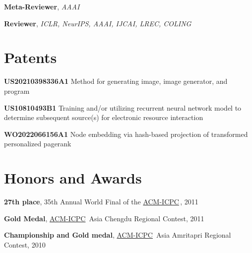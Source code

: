 \documentclass[line,margin]{cv}
\newcommand{\myemph}{\textbf}
\newcommand{\ICPC}{\href{http://icpc.baylor.edu/}{ACM-ICPC}}
\begin{document}
\begin{resume}
  \myemph{Meta-Reviewer}, \emph{AAAI}

  \myemph{Reviewer}, \emph{ICLR, NeurIPS, AAAI, IJCAI, LREC, COLING}

\section{Patents}

  \myemph{US20210398336A1} Method for generating image, image generator, and program

  \myemph{US10810493B1} Training and/or utilizing recurrent neural network model to determine subsequent source(s) for electronic resource interaction
  
  \myemph{WO2022066156A1} Node embedding via hash-based projection of transformed personalized pagerank
  

\section{Honors and Awards}
	\myemph{27th place}, 35th Annual World Final of the \ICPC \,, 2011

	\myemph{Gold Medal}, \ICPC\ Asia Chengdu Regional Contest, 2011

	\myemph{Championship and Gold medal}, \ICPC\ Asia Amritapri Regional Contest, 2010

\end{resume}
\end{document}
